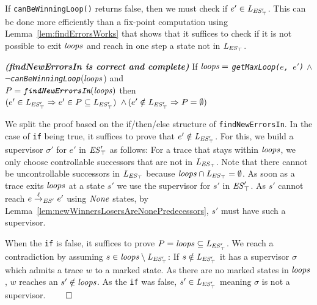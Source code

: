 If \texttt{canBeWinningLoop()} returns false, then we must check if  $e' \in \mathit{L_{\mathit{\mathit{ES}'_{\top}}}}$.
This can be done more efficiently than a fix-point 
computation using 
Lemma~\ref{lem:findErrorsWorks} that shows that it suffices 
to check if 
it is not possible to exit $\mathit{loops}$ and reach in one step a state not in 
$\mathit{L_{\mathit{\mathit{ES}_{\top}}}}$. 



\begin{lemma}\textbf{\emph{(findNewErrorsIn is correct and complete)}}
\label{lem:findErrorsWorks}
If $\mathit{loops} =$ \emph{\texttt{getMaxLoop($e$, $e'$)}} $\wedge$\\ 
$\neg$\emph{\texttt{canBeWinningLoop}}($\mathit{loops}$) and \\
$P=\emph{\texttt{findNewErrorsIn}}(\mathit{loops})$ then \\
$(e' \in \mathit{L_{\mathit{\mathit{ES}'_{\top}}}} \Rightarrow e' \in P 
\subseteq \mathit{L_{\mathit{\mathit{ES}'_{\top}}}})$ $\wedge \, (e' \notin \mathit{L_{\mathit{\mathit{ES}'_{\top}}}} \Rightarrow P = 
\emptyset)$
\end{lemma}

\begin{Proof Sketch}
We split the proof based on the if/then/else structure of \texttt{findNewErrorsIn}. 
In the case of \texttt{if} being true, it suffices to prove that $e' \notin \mathit{L_{\mathit{\mathit{ES}'_{\top}}}}$. For this, 
we build a supervisor $\sigma'$ for $e'$ in $\mathit{\mathit{ES}'_{\top}}$ as 
follows: For a trace that stays within $\mathit{loops}$, we only choose controllable successors 
that are not 
in $\mathit{L_{\mathit{\mathit{ES}_{\top}}}}$. Note that there cannot be uncontrollable successors in $\mathit{L_{\mathit{\mathit{ES}_{\top}}}}$ because 
$\mathit{loops} \cap \mathit{L_{\mathit{\mathit{ES}_{\top}}}}= \emptyset$.   As soon as a trace exits $\mathit{loops}$ at a state $s'$ we 
use the supervisor for $s'$ in $\mathit{\mathit{ES}'_{\top}}$. 
As $s'$ cannot reach $e \overset{\ell}{\rightarrow}_{\mathit{ES}'} 
e'$ using $\mathit{None}$ states, by 
Lemma~\ref{lem:newWinnersLosersAreNonePredecessors}, $s'$ must have such a 
supervisor. 

When the \texttt{if} is false, it suffices to prove $P = \mathit{loops} \subseteq \mathit{L_{\mathit{\mathit{ES}'_{\top}}}}$. We 
reach a contradiction  
 by assuming $s \in \mathit{loops} \setminus \mathit{L_{\mathit{\mathit{ES}'_{\top}}}}$: If $s 
\notin \mathit{L_{\mathit{\mathit{ES}'_{\top}}}}$ it has a supervisor $\sigma$ which admits a trace $w$ to a marked 
state. 
As 
there are no marked states in $\mathit{loops}$, $w$ reaches an  $s' \notin \mathit{loops}$. As 
the 
\texttt{if} was false, $s' \in \mathit{L_{\mathit{\mathit{ES}'_{\top}}}}$ meaning $\sigma$ is not a supervisor.
\hfill$\qed$
\end{Proof Sketch}

